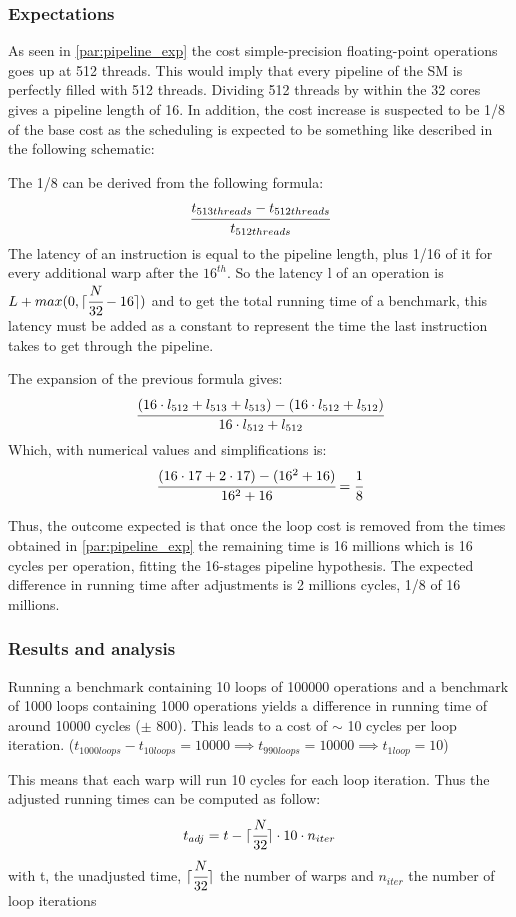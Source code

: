 \documentclass{article}
\DeclarePairedDelimiter\ceil{\lceil}{\rceil}
\begin{document}
	\subsubsection{Expectations}
	As seen in \ref{par:pipeline_exp} the cost simple-precision floating-point
    operations goes up at 512 threads. This would imply that every pipeline of
    the SM is perfectly filled with 512 threads. Dividing 512 threads by within
    the 32 cores gives a pipeline length of 16. In addition, the cost increase
    is suspected to be 1/8 of the base cost as the scheduling is expected to be
    something like described in the following schematic:

    The 1/8 can be derived from the following formula:
    \[ \cfrac{t_{513threads} - t_{512threads}}{t_{512threads}} \]
    The latency of an instruction is equal to the pipeline length, plus 1/16 of
    it for every additional warp after the $16^{th}$. So the latency l of an 
    operation is $L + max(0, \ceil{\cfrac{N}{32} -16})$ and to get the total
    running time of a benchmark, this latency must be added as a constant to
    represent the time the last instruction takes to get through the pipeline.

    The expansion of the previous formula gives:
    \[ \cfrac{(16\cdot l_{512} + l_{513} + l_{513}) - (16\cdot l_{512} + l_{512})}{16\cdot l_{512} + l_{512}} \]
    Which, with numerical values and simplifications is:
    \[ \cfrac{(16\cdot 17 + 2\cdot 17) - (16^2 + 16)}{16^2 + 16} = \cfrac{1}{8}\] 

    Thus, the outcome expected is that once the loop cost is removed from the 
    times obtained in \ref{par:pipeline_exp} the remaining time is 16 millions
    which is 16 cycles per operation, fitting the 16-stages pipeline hypothesis.
    The expected difference in running time after adjustments is 2 millions cycles,
    1/8 of 16 millions.

	\subsubsection{Results and analysis}
    Running a benchmark containing 10 loops of 100000 operations and a benchmark
    of 1000 loops containing 1000 operations yields a difference in running time of
    around 10000 cycles ($\pm$ 800). This leads to a cost of $\sim$ 10 cycles per
    loop iteration. ($t_{1000loops} - t_{10loops} = 10000 \implies t_{990loops} = 10000
    \implies t_{1loop} = 10$)
    
	This means that each warp will run 10 cycles for each loop iteration. Thus the 
    adjusted running times can be computed as follow:
    \[ t_{adj} = t - \ceil{\cfrac{N}{32}}\cdot 10 \cdot n_{iter} \]
    with t, the unadjusted time, $\ceil{\cfrac{N}{32}}$ the number of warps and 
    $n_{iter}$ the number of loop iterations
\end{document}
